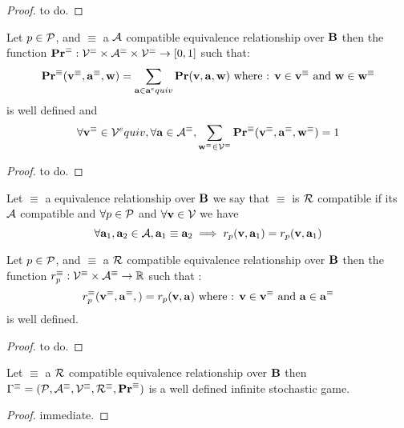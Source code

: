 \begin{proof}
	to do.
\end{proof}


\begin{myprop}
	Let $p \in \mathcal{P}$, and $\equiv$ a $\mathcal{A}$ compatible equivalence relationship over $\text{\bf B}$
	then the function $\mathbf{Pr}^\equiv : \mathcal{V}^\equiv \times \mathcal{A}^\equiv \times \mathcal{V}^\equiv \rightarrow [0,1]$ such that: 
	$$\mathbf{Pr}^\equiv(\mathbf{v}^\equiv,\mathbf{a}^\equiv,\mathbf{w}) = \sum_{\mathbf{a} \in \mathbf{a}^equiv}\mathbf{Pr}(\mathbf{v},\mathbf{a},\mathbf{w}) \mbox{ where : } \mathbf{v}\in \mathbf{v}^\equiv \mbox{ and } \mathbf{w} \in \mathbf{w}^\equiv$$ 
	is well defined and 
	$$\forall \mathbf{v}^\equiv \in \mathcal{V}^equiv,\forall \mathbf{a} \in \mathcal{A}^\equiv, \sum_{\mathbf{w} ^\equiv \in \mathcal{V}^\equiv} \mathbf{Pr}^\equiv(\mathbf{v}^\equiv, \mathbf{a}^\equiv, \mathbf{w}^\equiv)  =  1 $$
\end{myprop}
\begin{proof}
	to do.
\end{proof}

\begin{mydef}
	Let $\equiv$ a equivalence relationship over $\text{\bf B}$ we say that $\equiv$ is $\mathcal{R}$ compatible if its $\mathcal{A}$ compatible and $\forall p \in \mathcal{P}$ and $\forall \mathbf{v} \in \mathcal{V}$ we have 
	$$\forall \mathbf{a}_1,\mathbf{a}_2 \in \mathcal{A}, \mathbf{a}_1 \equiv \mathbf{a}_2 \implies r_p(\mathbf{v},\mathbf{a}_1) = r_p(\mathbf{v},\mathbf{a}_1)$$
\end{mydef}

\begin{myprop}
	Let $p \in \mathcal{P}$, and $\equiv$ a $\mathcal{R}$ compatible equivalence relationship over $\text{\bf B}$ then the function $r_p^\equiv : \mathcal{V}^\equiv \times \mathcal{A}^\equiv \rightarrow \mathbb{R}$ such that :
	$$r_p^\equiv(\mathbf{v}^\equiv,\mathbf{a}^\equiv,) = r_p(\mathbf{v},\mathbf{a}) \mbox{ where : } \mathbf{v}\in \mathbf{v}^\equiv \mbox{ and } \mathbf{a} \in \mathbf{a}^\equiv $$
	is well defined.
\end{myprop}
\begin{proof}
	to do.
\end{proof}

\begin{myprop}
	Let $\equiv$ a $\mathcal{R}$ compatible equivalence relationship over $\text{\bf B}$ then $\Gamma^\equiv = (\mathcal{P},\mathcal{A}^\equiv,\mathcal{V}^\equiv,\mathcal{R}^\equiv,\mathbf{Pr}^\equiv)$ is a well defined infinite stochastic game.
\end{myprop}

\begin{proof}
	immediate.
\end{proof}

